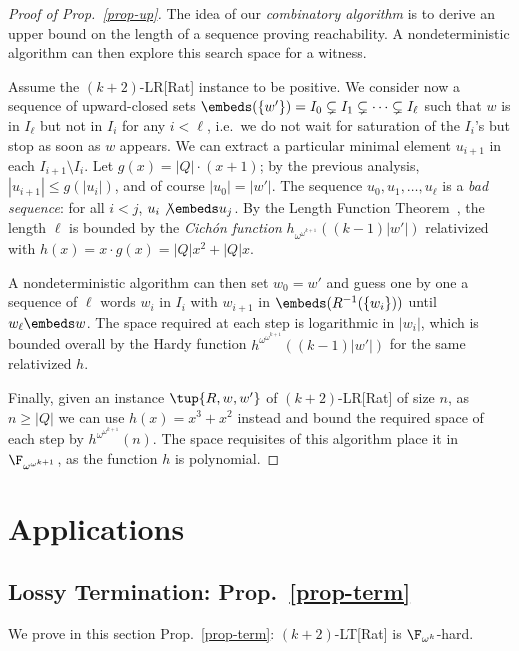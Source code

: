 \begin{proof}[Proof of Prop.~\ref{prop-up}] The idea of our
  \emph{combinatory algorithm} is to derive an upper bound on the
  length of a sequence proving reachability.  A nondeterministic
  algorithm can then explore this search space for a witness.

  Assume the $(k+2)$-LR[Rat] instance to be positive.  We consider now
  a sequence of upward-closed sets $\embeds(\{w'\})=I_0\subsetneq
  I_1\subsetneq \cdots\subsetneq I_\ell$ such that $w$ is in $I_\ell$
  but not in $I_i$ for any $i<\ell$, i.e.\ we do not wait for
  saturation of the $I_i$'s but stop as soon as $w$ appears.  We can
  extract a particular minimal element $u_{i+1}$ in each
  $I_{i+1}\setminus I_i$.  Let $g(x)=|Q|\cdot (x+1)$; by the previous
  analysis, $|u_{i+1}|\leq g(|u_i|)$, and of course $|u_0|=|w'|$.  The
  sequence $u_0,u_1,\dots,u_\ell$ is a \emph{bad sequence}: for all
  $i<j$, $u_i\not\embeds u_j$.  By the Length Function
  Theorem~\citep{SS-icalp2011}, the length $\ell$ is bounded by the
  \emph{Cich\'on function} $h_{\omega^{\omega^{k+1}}}((k-1)|w'|)$
  relativized with $h(x)=x\cdot g(x)=|Q|x^2+|Q|x$.

  A nondeterministic algorithm can then set $w_0=w'$ and guess one by
  one a sequence of $\ell$ words $w_i$ in $I_i$ with $w_{i+1}$ in
  $\embeds(R^{-1}(\{w_i\}))$ until $w_\ell\embeds w$.  The space
  required at each step is logarithmic in $|w_i|$, which is bounded
  overall by the Hardy function $h^{\omega^{\omega^{k+1}}}((k-1)|w'|)$
  for the same relativized $h$.

  Finally, given an instance $\tup{R,w,w'}$ of $(k+2)$-LR[Rat] of size
  $n$, as $n\geq|Q|$ we can use $h(x)=x^3+x^2$ instead and bound the
  required space of each step by $h^{\omega^{\omega^{k+1}}}(n)$. The
  space requisites of this algorithm place it in
  $\F_{\omega^{\omega^{k+1}}}$, as the function $h$ is polynomial.
\end{proof}

\section{Applications}

\subsection{Lossy Termination: Prop.~\ref{prop-term}}\label{ax-term}

We prove in this section Prop.~\ref{prop-term}: $(k+2)$-LT[Rat] is 
$\F_{\omega^k}$-hard.

